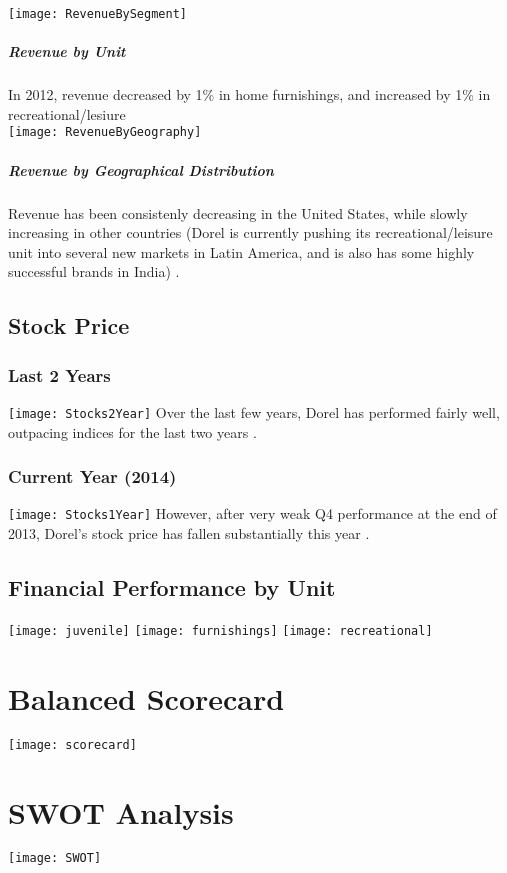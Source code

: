 \texttt{[image: RevenueBySegment]}
\paragraph{Revenue by Unit}In 2012, revenue decreased by 1\% in home furnishings, and increased by 1\% in recreational/lesiure
\\[1\baselineskip]

\texttt{[image: RevenueByGeography]}
\paragraph{Revenue by Geographical Distribution}Revenue has been consistenly decreasing in the United States, while slowly increasing in other countries (Dorel is currently pushing its recreational/leisure unit into several new markets in Latin America, and is also has some highly successful brands in India) \cite{BRAINStaff2013}.

\section {Stock Price}
\subsection{Last 2 Years}
\texttt{[image: Stocks2Year]}
Over the last few years, Dorel has performed fairly well, outpacing indices for the last two years \cite{YahooFinance2014}.

\subsection{Current Year (2014)}
\texttt{[image: Stocks1Year]}
However, after very weak Q4 performance at the end of 2013, Dorel's stock price has fallen substantially this year \cite{YahooFinance2014}.
\section {Financial Performance by Unit}
\texttt{[image: juvenile]}
\texttt{[image: furnishings]}
\texttt{[image: recreational]}

\chapter{Balanced Scorecard}
\label{chp:scorecard}
\texttt{[image: scorecard]}
\chapter{SWOT Analysis}
\label{chp:swot}
\texttt{[image: SWOT]}

